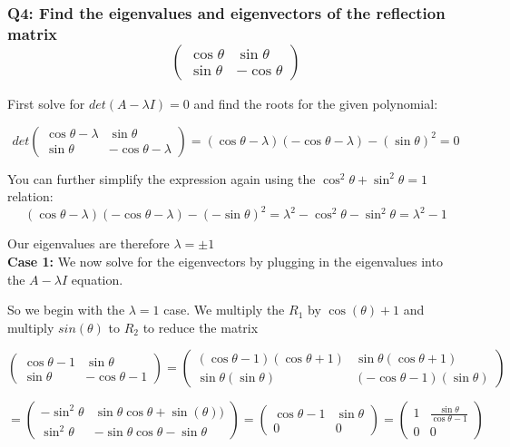 \documentclass[8pt]{article}
\begin{document}
\subsubsection*{Q4: Find the eigenvalues and eigenvectors of the reflection matrix
$$
\begin{pmatrix}
\cos \theta & \sin \theta \\
\sin \theta & -\cos \theta
\end{pmatrix}
$$}

First solve for $det(A- \lambda I) = 0$ and find the roots for the given polynomial:

$$
det \begin{pmatrix}
\cos \theta - \lambda & \sin \theta \\
\sin \theta & -\cos \theta - \lambda
\end{pmatrix} = (\cos \theta - \lambda) (-\cos \theta - \lambda) - (\sin \theta)^{2} = 0 
$$

You can further simplify the expression again using the $ \cos ^{2} \theta + \sin ^{2} \theta = 1$ relation:
$$
(\cos \theta - \lambda) (-\cos \theta - \lambda) - (-\sin \theta)^{2} = \lambda ^{2} - \cos ^{2} \theta - \sin ^{2} \theta = \lambda ^{2} -1
$$

Our eigenvalues are therefore $\lambda = \pm 1$ \\

\textbf{Case 1: }We now solve for the eigenvectors by plugging in the eigenvalues into the $A- \lambda I$ equation. 

So we begin with the $\lambda=1$ case. We multiply the $R_1$ by $\cos(\theta) +1$ and multiply $sin(\theta)$ to $R_2$ to reduce the matrix

$$
\begin{pmatrix}
\cos \theta -1 & \sin \theta \\
\sin \theta & -\cos \theta - 1
\end{pmatrix} = 
\begin{pmatrix}
(\cos \theta -1)(\cos \theta +1) & \sin \theta (\cos \theta +1)\\
\sin \theta (\sin \theta) & (-\cos \theta -1)(\sin \theta)
\end{pmatrix} 
$$

$$
= \begin{pmatrix}
-\sin^2 \theta & \sin \theta \cos \theta + \sin(\theta))\\
\sin^2 \theta & -\sin \theta\cos \theta -\sin \theta
\end{pmatrix} =
\begin{pmatrix}
\cos \theta -1 & \sin \theta \\
0 & 0
\end{pmatrix} = 
\begin{pmatrix}
1 & \frac{\sin \theta}{\cos \theta -1} \\
0 & 0
\end{pmatrix}
$$
\end{document}
